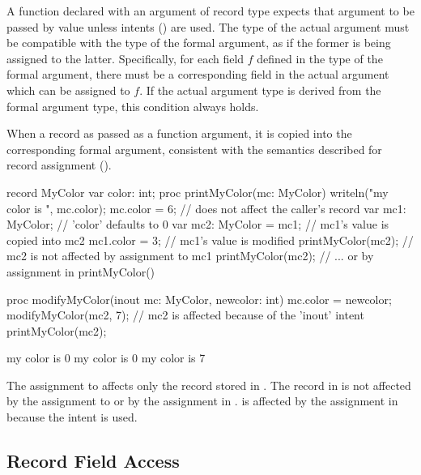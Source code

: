 A function declared with an argument of record type expects that argument to be
passed by value unless intents () are used.  The type of the
actual argument must be compatible with the type of the formal argument, as if
the former is being assigned to the latter.  Specifically, for each field $f$
defined in the type of the formal argument, there must be a corresponding field
in the actual argument which can be assigned to $f$.  If the actual argument
type is derived from the formal argument type, this condition always holds.

When a record as passed as a function argument, it is copied into
the corresponding formal argument, consistent with the semantics described for
record assignment ().

\begin{example}
\begin{chapelpre}
\end{chapelpre}
\begin{chapel}
record MyColor {
  var color: int;
}
proc printMyColor(mc: MyColor) {
  writeln("my color is ", mc.color);
  mc.color = 6;   // does not affect the caller's record
}
var mc1: MyColor;        // 'color' defaults to 0
var mc2: MyColor = mc1;  // mc1's value is copied into mc2
mc1.color = 3;           // mc1's value is modified
printMyColor(mc2);       // mc2 is not affected by assignment to mc1
printMyColor(mc2);       // ... or by assignment in printMyColor()

proc modifyMyColor(inout mc: MyColor, newcolor: int) {
  mc.color = newcolor;
}
modifyMyColor(mc2, 7);   // mc2 is affected because of the 'inout' intent
printMyColor(mc2);
\end{chapel}
\begin{chapeloutput}
my color is 0
my color is 0
my color is 7
\end{chapeloutput}
The assignment to  affects only the record stored
in . The record in  is not affected by
the assignment to  or by the assignment in .
 is affected by the assignment in 
because the intent  is used.
\end{example}

\subsection{Record Field Access}
\label{Record_Field_Access}

